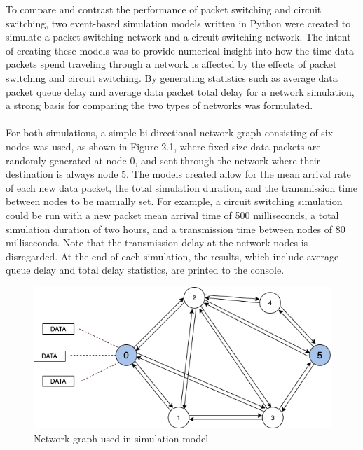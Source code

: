 \documentclass{article}
\begin{document}
  To compare and contrast the performance of packet switching and circuit switching, two event-based simulation models
  written in Python were created to simulate a packet switching network and a circuit switching network. The intent of
  creating these models was to provide numerical insight into how the time data packets spend traveling through a network
  is affected by the effects of packet switching and circuit switching. By generating statistics such as average data packet
  queue delay and average data packet total delay for a network simulation, a strong basis for comparing the two types of
  networks was formulated.\\\\
  For both simulations, a simple bi-directional network graph consisting of six nodes was used, as shown in Figure 2.1, where fixed-size data packets
  are randomly generated at node 0, and sent through the network where their destination is always node 5. The models
  created allow for the mean arrival rate of each new data packet, the total simulation duration, and the transmission time
  between nodes to be manually set. For example, a circuit switching simulation could be run with a new packet mean arrival time of 500 milliseconds, a
  total simulation duration of two hours, and a transmission time between nodes of 80 milliseconds. Note that the transmission delay
  at the network nodes is disregarded. At the end of each simulation, the results, which include average queue delay and total delay statistics, are printed to the console.

  \begin{figure}[h]
  \centering
          \includegraphics[totalheight=6cm]{images/network_graph.png}
  \renewcommand\figurename{Figure}
      \caption{Network graph used in simulation model}
      \label{fig:networkgraph}
  \end{figure}
\end{document}
